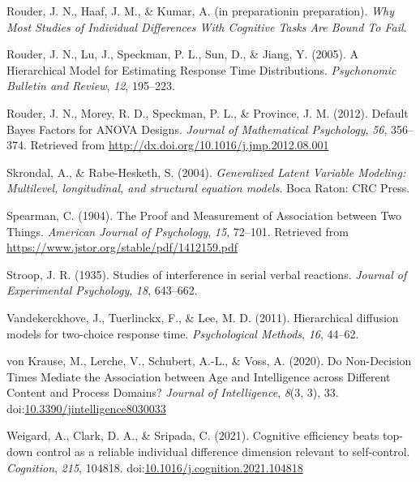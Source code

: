 \documentclass[
  ,man]{apa6}
\newlength{\cslhangindent}
\newlength{\cslentryspacingunit} %
\newenvironment{CSLReferences}[2] %
 {%
  \setlength{\parindent}{0pt}
  \ifodd #1
  \let\oldpar\par
  \def\par{\hangindent=\cslhangindent\oldpar}
  \fi
  \setlength{\parskip}{#2\cslentryspacingunit}
 }%
 {}
\begin{document}
\begin{CSLReferences}{1}{0}
\leavevmode{}%
Rouder, J. N., Haaf, J. M., \& Kumar, A. (in preparationin preparation). \emph{Why {Most Studies} of {Individual Differences With Cognitive Tasks Are Bound To Fail}}.

\leavevmode{}%
Rouder, J. N., Lu, J., Speckman, P. L., Sun, D., \& Jiang, Y. (2005). A {Hierarchical Model} for {Estimating Response Time Distributions}. \emph{Psychonomic Bulletin and Review}, \emph{12}, 195--223.

\leavevmode{}%
Rouder, J. N., Morey, R. D., Speckman, P. L., \& Province, J. M. (2012). Default {Bayes Factors} for {ANOVA Designs}. \emph{Journal of Mathematical Psychology}, \emph{56}, 356--374. Retrieved from \url{http://dx.doi.org/10.1016/j.jmp.2012.08.001}

\leavevmode{}%
Skrondal, A., \& Rabe-Hesketh, S. (2004). \emph{Generalized {Latent Variable Modeling}: Multilevel, longitudinal, and structural equation models}. {Boca Raton}: {CRC Press}.

\leavevmode{}%
Spearman, C. (1904). The {Proof} and {Measurement} of {Association} between {Two Things}. \emph{American Journal of Psychology}, \emph{15}, 72--101. Retrieved from \url{https://www.jstor.org/stable/pdf/1412159.pdf}

\leavevmode{}%
Stroop, J. R. (1935). Studies of interference in serial verbal reactions. \emph{Journal of Experimental Psychology}, \emph{18}, 643--662.

\leavevmode{}%
Vandekerckhove, J., Tuerlinckx, F., \& Lee, M. D. (2011). Hierarchical diffusion models for two-choice response time. \emph{Psychological Methods}, \emph{16}, 44--62.

\leavevmode{}%
von Krause, M., Lerche, V., Schubert, A.-L., \& Voss, A. (2020). Do {Non-Decision Times Mediate} the {Association} between {Age} and {Intelligence} across {Different Content} and {Process Domains}? \emph{Journal of Intelligence}, \emph{8}(3, 3), 33. doi:\href{https://doi.org/10.3390/jintelligence8030033}{10.3390/jintelligence8030033}

\leavevmode{}%
Weigard, A., Clark, D. A., \& Sripada, C. (2021). Cognitive efficiency beats top-down control as a reliable individual difference dimension relevant to self-control. \emph{Cognition}, \emph{215}, 104818. doi:\href{https://doi.org/10.1016/j.cognition.2021.104818}{10.1016/j.cognition.2021.104818}


\end{CSLReferences}
\end{document}
